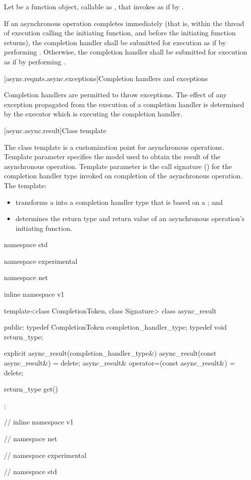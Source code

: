 \pnum
Let  be a function object, callable as , that invokes  as if by .

\pnum
If an asynchronous operation completes immediately (that is, within the thread of execution calling the initiating function, and before the initiating function returns), the completion handler shall be submitted for execution as if by performing . Otherwise, the completion handler shall be submitted for execution as if by performing .



[async.reqmts.async.exceptions]{Completion handlers and exceptions}

\pnum
 Completion handlers are permitted to throw exceptions. The effect of any exception propagated from the execution of a completion handler is determined by the executor which is executing the completion handler.





[async.async.result]{Class template }

\pnum
The  class template is a customization point for asynchronous operations. Template parameter  specifies the model used to obtain the result of the asynchronous operation. Template parameter  is the call signature () for the completion handler type invoked on completion of the asynchronous operation. The  template:

\begin{itemize}
\item
transforms a  into a completion handler type that is based on a ; and

\item
determines the return type and return value of an asynchronous operation's initiating function.
\end{itemize}

\begin{codeblock}
namespace std {
namespace experimental {
namespace net {
inline namespace v1 {

  template<class CompletionToken, class Signature>
  class async_result
  {
  public:
    typedef CompletionToken completion_handler_type;
    typedef void return_type;

    explicit async_result(completion_handler_type&) {}
    async_result(const async_result&) = delete;
    async_result& operator=(const async_result&) = delete;

    return_type get() {}
  };

} // inline namespace v1
} // namespace net
} // namespace experimental
} // namespace std
\end{codeblock}

